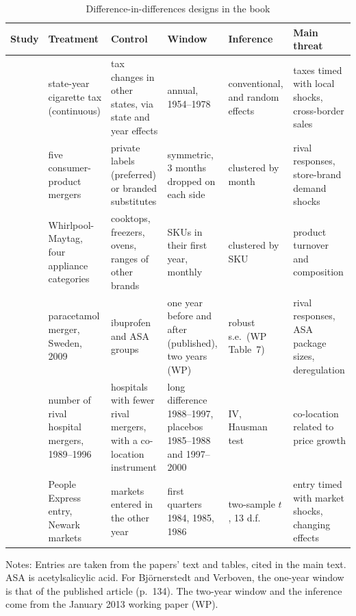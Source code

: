\begin{table}[htbp]
\centering
\caption{Difference-in-differences designs in the book}
\label{tab:A-did-apps}
\footnotesize
\begin{tabularx}{\textwidth}{@{}>{\raggedright\arraybackslash}p{2.05cm}>{\raggedright\arraybackslash}X>{\raggedright\arraybackslash}X>{\raggedright\arraybackslash}p{2.2cm}>{\raggedright\arraybackslash}p{1.9cm}>{\raggedright\arraybackslash}X@{}}
\toprule
Study & Treatment & Control & Window & Inference & Main threat\\
\midrule
\citet{Sumner1981} & state-year cigarette tax (continuous) & tax changes in other states, via state and year effects & annual, 1954--1978 & conventional, and random effects & taxes timed with local shocks, cross-border sales\\
\addlinespace
\citet{AshenfelterHosken2010} & five consumer-product mergers & private labels (preferred) or branded substitutes & symmetric, 3 months dropped on each side & clustered by month & rival responses, store-brand demand shocks\\
\addlinespace
\citet{AshenfelterHoskenWeinberg2013} & Whirlpool-Maytag, four appliance categories & cooktops, freezers, ovens, ranges of other brands & SKUs in their first year, monthly & clustered by SKU & product turnover and composition\\
\addlinespace
\citet{BjornerstedtVerboven2016} & paracetamol merger, Sweden, 2009 & ibuprofen and ASA groups & one year before and after (published), two years (WP) & robust s.e.\ (WP Table~7) & rival responses, ASA package sizes, deregulation\\
\addlinespace
\citet{Dafny2009} & number of rival hospital mergers, 1989--1996 & hospitals with fewer rival mergers, with a co-location instrument & long difference 1988--1997, placebos 1985--1988 and 1997--2000 & IV, Hausman test & co-location related to price growth\\
\addlinespace
\citet{WhinstonCollins1992} & People Express entry, Newark markets & markets entered in the other year & first quarters 1984, 1985, 1986 & two-sample $t$, 13 d.f. & entry timed with market shocks, changing effects\\
\bottomrule
\end{tabularx}

\smallskip
\parbox{\textwidth}{\footnotesize Notes: Entries are taken from the papers' text and tables, cited in the main
text. ASA is acetylsalicylic acid. For Bj\"ornerstedt and Verboven, the one-year window is that of the published
article (p.~134). The two-year window and the inference come from the January 2013 working paper (WP).}
\end{table}

